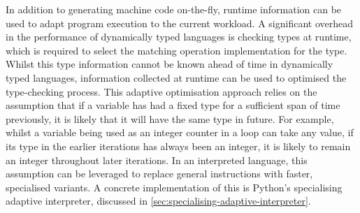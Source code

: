 In addition to generating machine code on-the-fly, runtime information can be used to adapt program execution to the current workload.
A significant overhead in the performance of dynamically typed languages is checking types at runtime, which is required to select the matching operation implementation for the type.
Whilst this type information cannot be known ahead of time in dynamically typed languages, information collected at runtime can be used to optimised the type-checking process. This adaptive optimisation approach relies on the assumption that if a variable has had a fixed type for a sufficient span of time previously, it is likely that it will have the same type in future. For example, whilst a variable being used as an integer counter in a loop can take any value, if its type in the earlier iterations has always been an integer, it is likely to remain an integer throughout later iterations.
In an interpreted language, this assumption can be leveraged to replace general instructions with faster, specialised variants. A concrete implementation of this is Python's specialising adaptive interpreter, discussed in \autoref{sec:specialising-adaptive-interpreter}.
